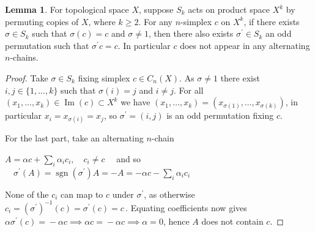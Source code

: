 \documentclass[11pt,a4paper,twoside]{article}
\theoremstyle{plain}
\theoremstyle{definition}
\theoremstyle{definition}
\newtheorem{lemma}[thm]{Lemma}
\theoremstyle{definition}
\theoremstyle{definition}
\theoremstyle{definition}
\DeclareMathOperator{\Ima}{Im}
\DeclareMathOperator{\sgn}{sgn}
\begin{document}
\vspace{2mm}
\begin{lemma}
\label{PermFix_NonAlt}
For topological space $X$, suppose $S_k$ acts on product space $X^k$ by permuting copies of $X$, where $k\geq 2$. For any $n$-simplex $c$ on $X^k$, if there exists $\sigma\in S_k$ such that $\sigma (c)\!=\!c$ and $\sigma\!\neq\! 1$, then there also exists $\sigma^\prime\in S_k$ an odd permutation such that $\sigma^\prime c=c$. In particular $c$ does not appear in any alternating $n$-chains.
\end{lemma}
\begin{proof}
Take $\sigma \in S_k$ fixing simplex $c\in C_n(X)$. As $\sigma\!\neq\!1$ there exist $i,j\in\{1,...,k\}$ such that $\sigma(i)\!=\!j$ and $i\!\neq\! j$. For all $(x_1,\dots,x_k)\in\Ima(c)\subset X^k$ we have $(x_1,\dots,x_k)=(x_{\sigma(1)},\dots,x_{\sigma(k)})$, in particular $x_i=x_{\sigma(i)}=x_j$, so $\sigma^\prime=(i,j)$ is an odd permutation fixing $c$.

For the last part, take an alternating $n$-chain 
\begin{center}$A=\alpha c + \underset{i}{\sum} \alpha_i c_i,\quad c_i\neq c \quad$ and so $\quad\sigma^\prime(A)=\sgn(\sigma^\prime)A=-A=-\alpha c -\! \underset{i}{\sum} \alpha_i c_i$\end{center}
None of the $c_i$ can map to $c$ under $\sigma^\prime$, as otherwise $c_i\!=\!(\sigma^\prime)^{-1}(c)\!=\!\sigma^\prime(c)\!=\!c\,$. Equating coefficients now gives $\alpha \sigma^\prime(c)\!=\!-\alpha c\implies\alpha c\!=\!-\alpha c\implies\alpha=0$, hence $A$ does not contain $c$.
\end{proof}
\end{document}
